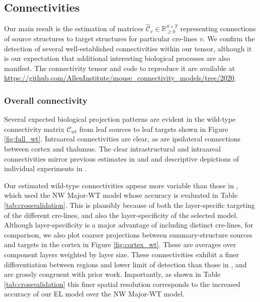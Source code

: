 \newpage

\subsection{Connectivities}

Our main result is the estimation of matrices $\hat {\mathcal C}_v \in \mathbb R_{\geq 0}^{S \times T}$ representing connections of source structures to target structures for particular cre-lines $v$. 
We confirm the detection of several well-established connectivities within our tensor, although it is our expectation that additional interesting biological processes are also manifest.
The connectivity tensor and code to reproduce it are available at \url{https://github.com/AllenInstitute/mouse_connectivity_models/tree/2020}.

\subsubsection{Overall connectivity}

Several expected biological projection patterns are evident in the wild-type connectivity matrix $\mathcal C_{wt}$ from leaf sources to leaf targets shown in Figure \ref{fig:full_wt}.
Intraareal connectivities are clear, as are ipsilateral connections between cortex and thalumus.
The clear intrastructural and intraareal connectivities mirror previous estimates in \citet{Oh2014-kh} and \citet{Knox2019-ot} and descriptive depictions of individual experiments in \citet{Harris2019-mr}.

Our estimated wild-type connectivities appear more variable than those in \citet{Knox2019-ot}, which used the NW Major-WT model whose accuracy is evaluated in Table \ref{tab:crossvalidation}.
This is plausibly because of both the layer-specific targeting of the different cre-lines, and also the layer-specificity of the selected model.
Although layer-specificity is a major advantage of including distinct cre-lines, for comparison, we also plot coarser projections between summary-structure sources and targets in the cortex in Figure \ref{fig:cortex_wt}.
These are averages over component layers weighted by layer size.
These connectivities exhibit a finer differentiation between regions and lower limit of detection than those in \citet{Knox2019-ot}, and are grossly congruent with prior work.
Importantly, as shown in Table \ref{tab:crossvalidation} this finer spatial resolution corresponds to the increased accuracy of our EL model over the NW Major-WT model.

